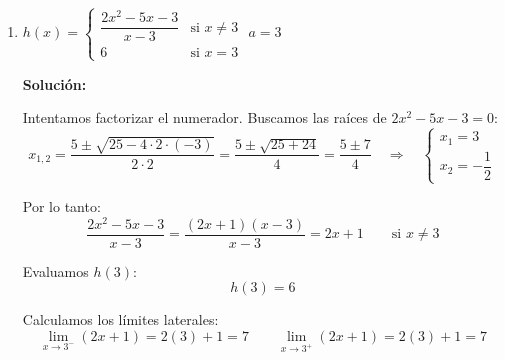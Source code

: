 \documentclass[12pt]{article}
\newcommand{\solucion}{%
    \vspace{0.8em}%
    \textbf{Solución:}%
}
\begin{document}
\begin{enumerate}[label=\alph*)]
    Sin embargo: $g(0) = 0 \neq 1 = \displaystyle\lim_{x \to 0} g(x)$.

    $\therefore$ $g(x)$ es discontinua \textbf{evitable}. Para evitarla habría que redefinir $g(0) = 1$.

    \begin{center}
    \end{center}

    \newpage
    \item $h(x) = \begin{cases} \dfrac{2x^2 - 5x - 3}{x - 3} & \text{si } x \neq 3 \\ 6 & \text{si } x = 3 \end{cases}$ \quad $a = 3$

    \solucion

    Intentamos factorizar el numerador. Buscamos las raíces de $2x^2 - 5x - 3 = 0$:
    \[
    x_{1,2} = \frac{5 \pm \sqrt{25 - 4 \cdot 2 \cdot (-3)}}{2 \cdot 2} = \frac{5 \pm \sqrt{25 + 24}}{4} = \frac{5 \pm 7}{4}
    \quad \Rightarrow \quad
    \begin{cases} x_1 = 3 \\ x_2 = -\dfrac{1}{2} \end{cases}
    \]

    Por lo tanto:
    \[
    \frac{2x^2 - 5x - 3}{x - 3} = \frac{(2x+1)(x-3)}{x-3} = 2x + 1 \qquad \text{si } x \neq 3
    \]

    Evaluamos $h(3)$:
    \[
    h(3) = 6
    \]

    Calculamos los límites laterales:
    \[
    \lim_{x \to 3^-} (2x+1) = 2(3)+1 = 7 \qquad \lim_{x \to 3^+} (2x+1) = 2(3)+1 = 7
    \]


\end{enumerate}
\end{document}
